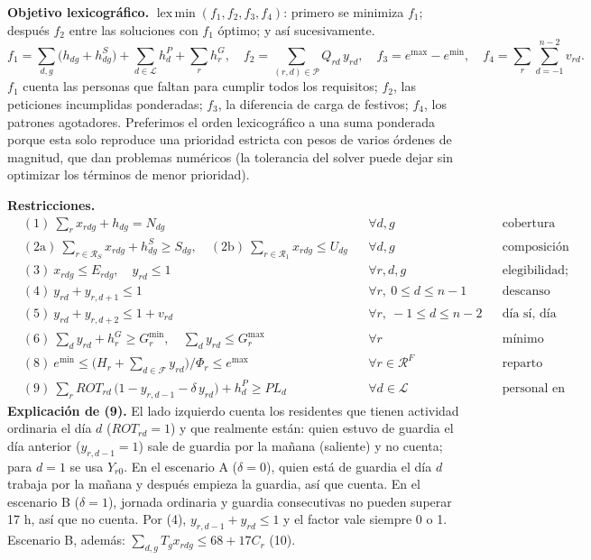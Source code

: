 \documentclass[10pt,a4paper]{article}
\newcommand{\R}{\mathcal{R}}\newcommand{\D}{\mathcal{D}}\newcommand{\G}{\mathcal{G}}
\newcommand{\F}{\mathcal{F}}\newcommand{\Lab}{\mathcal{L}}\newcommand{\Pet}{\mathcal{P}}
\begin{document}
\textbf{Objetivo lexicográfico.} $\operatorname{lex\,min}(f_1,f_2,f_3,f_4)$: primero se minimiza $f_1$; después $f_2$ entre las soluciones con $f_1$ óptimo; y así sucesivamente.
\[
f_1=\sum_{d,g}\bigl(h_{dg}+h^S_{dg}\bigr)+\sum_{d\in\Lab}h^P_d+\sum_r h^G_r,\quad
f_2=\sum_{(r,d)\in\Pet}Q_{rd}\,y_{rd},\quad
f_3=e^{\max}-e^{\min},\quad
f_4=\sum_{r}\sum_{d=-1}^{n-2}v_{rd}.
\]
$f_1$ cuenta las personas que faltan para cumplir todos los requisitos; $f_2$, las peticiones incumplidas ponderadas; $f_3$, la diferencia de carga de festivos; $f_4$, los patrones agotadores. Preferimos el orden lexicográfico a una suma ponderada porque esta solo reproduce una prioridad estricta con pesos de varios órdenes de magnitud, que dan problemas numéricos (la tolerancia del solver puede dejar sin optimizar los términos de menor prioridad).

\textbf{Restricciones.}
{\small
\begin{align*}
&(1)\ \textstyle\sum_r x_{rdg}+h_{dg}=N_{dg} &&\forall d,g &&\text{cobertura}\\
&(2\text{a})\ \textstyle\sum_{r\in\R_S}x_{rdg}+h^S_{dg}\geq S_{dg},\quad (2\text{b})\ \sum_{r\in\R_1}x_{rdg}\leq U_{dg} &&\forall d,g &&\text{composición por experiencia}\\
&(3)\ x_{rdg}\leq E_{rdg},\quad y_{rd}\leq1 &&\forall r,d,g &&\text{elegibilidad; una guardia al día}\\
&(4)\ y_{rd}+y_{r,d+1}\leq1 &&\forall r,\ 0\leq d\leq n-1 &&\text{descanso tras guardia}\\
&(5)\ y_{rd}+y_{r,d+2}\leq1+v_{rd} &&\forall r,\ -1\leq d\leq n-2 &&\text{día sí, día no (blanda)}\\
&(6)\ \textstyle\sum_d y_{rd}+h^G_r\geq G^{\min}_r,\quad \sum_d y_{rd}\leq G^{\max}_r &&\forall r &&\text{mínimo formativo y máximo}\\
&(8)\ e^{\min}\leq \bigl(H_r+\textstyle\sum_{d\in\F}y_{rd}\bigr)/\Phi_r\leq e^{\max} &&\forall r\in\R^F &&\text{reparto justo de festivos}\\
&(9)\ \textstyle\sum_r ROT_{rd}\,\bigl(1-y_{r,d-1}-\delta\,y_{rd}\bigr)+h^P_d\geq PL_d &&\forall d\in\Lab &&\text{personal en planta}
\end{align*}}
\textbf{Explicación de (9).} El lado izquierdo cuenta los residentes que tienen actividad ordinaria el día $d$ ($ROT_{rd}=1$) y que realmente están: quien estuvo de guardia el día anterior ($y_{r,d-1}=1$) sale de guardia por la mañana (saliente) y no cuenta; para $d=1$ se usa $Y_{r0}$. En el escenario A ($\delta=0$), quien está de guardia el día $d$ trabaja por la mañana y después empieza la guardia, así que cuenta. En el escenario B ($\delta=1$), jornada ordinaria y guardia consecutivas no pueden superar 17 h, así que no cuenta. Por (4), $y_{r,d-1}+y_{rd}\leq1$ y el factor vale siempre 0 o 1. Escenario B, además: $\sum_{d,g}T_g x_{rdg}\leq 68+17C_r$ (10).
\end{document}
